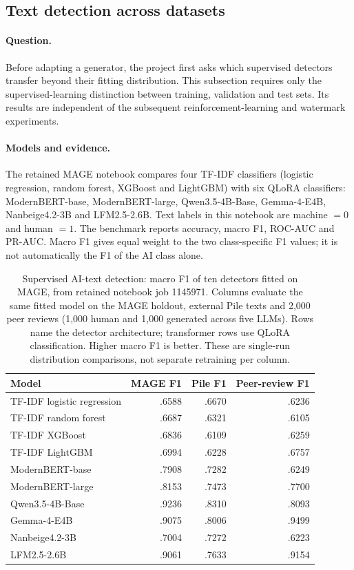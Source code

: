 \subsection{Text detection across datasets}
\label{sec:text_bench}
\paragraph{Question.} Before adapting a generator, the project first asks which supervised detectors transfer beyond their fitting distribution. This subsection requires only the supervised-learning distinction between training, validation and test sets. Its results are independent of the subsequent reinforcement-learning and watermark experiments.

\paragraph{Models and evidence.} The retained MAGE notebook compares four TF-IDF classifiers (logistic regression, random forest, XGBoost and LightGBM) with six QLoRA classifiers: ModernBERT-base, ModernBERT-large, Qwen3.5-4B-Base, Gemma-4-E4B, Nanbeige4.2-3B and LFM2.5-2.6B. Text labels in this notebook are machine $=0$ and human $=1$. The benchmark reports accuracy, macro F1, ROC-AUC and PR-AUC. Macro F1 gives equal weight to the two class-specific F1 values; it is not automatically the F1 of the AI class alone.

\begin{table}[ht]\centering\small
\begin{tabular}{lrrr}\toprule
Model & MAGE F1 & Pile F1 & Peer-review F1\\\midrule
TF-IDF logistic regression & .6588 & .6670 & .6236\\
TF-IDF random forest & .6687 & .6321 & .6105\\
TF-IDF XGBoost & .6836 & .6109 & .6259\\
TF-IDF LightGBM & .6994 & .6228 & .6757\\
ModernBERT-base & .7908 & .7282 & .6249\\
ModernBERT-large & .8153 & .7473 & .7700\\
Qwen3.5-4B-Base & .9236 & .8310 & .8093\\
Gemma-4-E4B & .9075 & .8006 & .9499\\
Nanbeige4.2-3B & .7004 & .7272 & .6223\\
LFM2.5-2.6B & .9061 & .7633 & .9154\\\bottomrule
\end{tabular}
\caption{Supervised AI-text detection: macro F1 of ten detectors fitted on MAGE, from retained notebook job 1145971. Columns evaluate the same fitted model on the MAGE holdout, external Pile texts and 2,000 peer reviews (1,000 human and 1,000 generated across five LLMs). Rows name the detector architecture; transformer rows use QLoRA classification. Higher macro F1 is better. These are single-run distribution comparisons, not separate retraining per column.}
\end{table}

